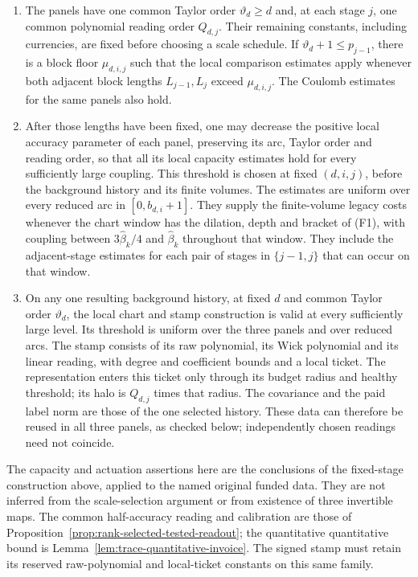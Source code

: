 \begin{enumerate}
\item The panels have one common Taylor order $\vartheta_d\ge d$ and,
 at each stage $j$, one common polynomial reading order $Q_{d,j}$.
 Their remaining constants, including currencies, are fixed before
 choosing a scale schedule. If $\vartheta_d+1\le p_{j-1}$, there is a
 block floor $\mu_{d,i,j}$ such that the local comparison estimates
 apply whenever both adjacent block lengths $L_{j-1},L_j$ exceed
 $\mu_{d,i,j}$. The Coulomb estimates for the same panels also hold.
\item After those lengths have been fixed, one may decrease the positive
 local accuracy parameter of each panel, preserving its arc, Taylor
 order and reading order, so that all its local capacity estimates
 hold for every sufficiently large coupling. This threshold is chosen
 at fixed $(d,i,j)$, before the background history and its finite volumes.
 The estimates are uniform over every reduced arc in
 $[0,b_{d,i}+1]$. They supply the finite-volume legacy costs whenever
 the chart window has the dilation, depth and bracket of (F1), with
 coupling between $3\widehat\beta_k/4$ and $\widehat\beta_k$ throughout
 that window. They include the adjacent-stage estimates for each pair
 of stages in $\{j-1,j\}$ that can occur on that window.
\item On any one resulting background history, at fixed $d$ and common
 Taylor order $\vartheta_d$, the local chart and stamp construction is
 valid at every sufficiently large level. Its threshold is uniform
 over the three panels and over reduced arcs. The stamp consists of its raw polynomial, its Wick polynomial and
 its linear reading, with degree and coefficient bounds and a local
 ticket. The representation enters this ticket only through its budget
 radius and healthy threshold; its halo is $Q_{d,j}$ times that radius.
 The covariance and the paid label norm are those of the one selected
 history. These data can therefore be reused in all three panels, as
 checked below; independently chosen readings need not coincide.
\end{enumerate}
The capacity and actuation assertions here are the conclusions of the
fixed-stage construction above, applied to the named original funded
data. They are not inferred from the scale-selection argument or from
existence of three invertible maps. The common half-accuracy reading
and calibration are those of
Proposition~\ref{prop:rank-selected-tested-readout}; the quantitative
quantitative bound is Lemma~\ref{lem:trace-quantitative-invoice}. The signed stamp
must retain its reserved raw-polynomial and local-ticket constants on
this same family.


